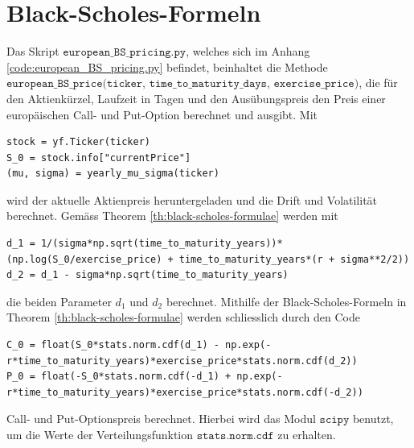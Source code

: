 \documentclass[11pt]{report} %
\begin{document}
\section{Black-Scholes-Formeln}
Das Skript $\texttt{european\_BS\_pricing.py}$, welches sich im Anhang \ref{code:european_BS_pricing.py} befindet, beinhaltet die Methode $\texttt{european\_BS\_price(ticker, time\_to\_maturity\_days, exercise\_price)}$, die für den Aktienkürzel, Laufzeit in Tagen und den Ausübungspreis den Preis einer europäischen Call- und Put-Option berechnet und ausgibt. Mit \begin{lstlisting}
stock = yf.Ticker(ticker)
S_0 = stock.info["currentPrice"]
(mu, sigma) = yearly_mu_sigma(ticker)
\end{lstlisting} wird der aktuelle Aktienpreis heruntergeladen und die Drift und Volatilität berechnet. Gemäss Theorem \ref{th:black-scholes-formulae} werden mit \begin{lstlisting}
d_1 = 1/(sigma*np.sqrt(time_to_maturity_years))*(np.log(S_0/exercise_price) + time_to_maturity_years*(r + sigma**2/2))
d_2 = d_1 - sigma*np.sqrt(time_to_maturity_years)
\end{lstlisting} die beiden Parameter $d_1$ und $d_2$ berechnet. Mithilfe der Black-Scholes-Formeln in Theorem \ref{th:black-scholes-formulae} werden schliesslich durch den Code\begin{lstlisting}
C_0 = float(S_0*stats.norm.cdf(d_1) - np.exp(-r*time_to_maturity_years)*exercise_price*stats.norm.cdf(d_2))
P_0 = float(-S_0*stats.norm.cdf(-d_1) + np.exp(-r*time_to_maturity_years)*exercise_price*stats.norm.cdf(-d_2))
\end{lstlisting}Call- und Put-Optionspreis berechnet. Hierbei wird das Modul $\texttt{scipy}$ benutzt, um die Werte der Verteilungsfunktion $\texttt{stats.norm.cdf}$ zu erhalten.
\end{document}
